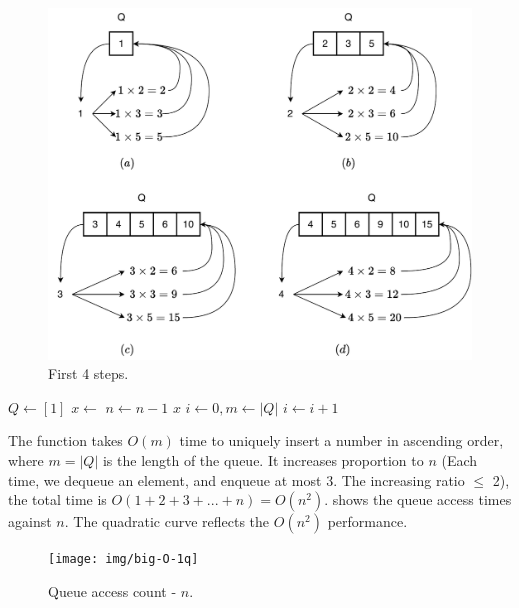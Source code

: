 \documentclass[b5paper]{article}
\begin{document}
\begin{figure}[htbp]
  \centering
  \includegraphics[scale=0.5]{img/regular-num-1q}
  \caption{First 4 steps.}
  \label{fig:queues}
\end{figure}

\begin{algorithmic}[1]
  \State $Q \gets [1]$
    \State $x \gets$ 
    \State {}
    \State {}
    \State {}
    \State $n \gets n-1$
  \EndWhile
  \State \Return $x$
\EndFunction
\Statex
{}
  \State $i \gets 0, m \gets |Q|$
    \State $i \gets i + 1$
  \EndWhile
    \State {}
  \EndIf
\EndFunction
\end{algorithmic}

The  function takes $O(m)$ time to uniquely insert a number in ascending order, where $m = |Q|$ is the length of the queue. It increases proportion to $n$ (Each time, we dequeue an element, and enqueue at most 3. The increasing ratio $\leq$ 2), the total time is $O(1 + 2 + 3 + ... + n) = O(n^2)$.  shows the queue access times against $n$. The quadratic curve reflects the $O(n^2)$ performance.

\begin{figure}[htbp]
  \centering
  \texttt{[image: img/big-O-1q]}
  \caption{Queue access count - $n$.}
  \label{fig:big-O-1q}
\end{figure}
\end{document}
